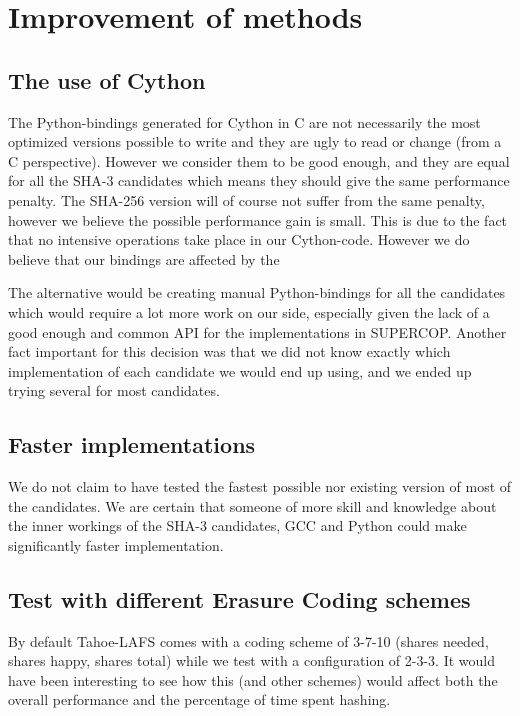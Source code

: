 \documentclass[english,12pt,a4paper]{book}
\begin{document}
%
%
%

\section{Improvement of methods}

\subsection{The use of Cython}


The Python-bindings generated for Cython in C are not necessarily the most
optimized versions possible to write and they are ugly to read or change (from
a C perspective). However we consider them to be good enough, and they are
equal for all the \ac{SHA}-3 candidates which means they should give the same
performance penalty. The \ac{SHA}-256 version will of course not suffer from
the same penalty, however we believe the possible performance gain is small.
This is due to the fact that no intensive operations take place in our
Cython-code. However we do believe that our bindings are affected by the 

The alternative would be creating manual Python-bindings for all the candidates
which would require a lot more work on our side, especially given the lack of a
good enough and common \ac{API} for the implementations in \ac{SUPERCOP}.
Another fact important for this decision was that we did not know exactly which
implementation of each candidate we would end up using, and we ended up trying
several for most candidates.

\subsection{Faster implementations}
We do not claim to have tested the fastest possible nor existing version
of most of the candidates. We are certain that someone of more skill and
knowledge about the inner workings of the \ac{SHA}-3 candidates, \ac{GCC} and
Python could make significantly faster implementation.

\subsection{Test with different Erasure Coding schemes}
By default Tahoe-\ac{LAFS} comes with a coding scheme of 3-7-10 (shares needed,
shares happy, shares total) while we test with a configuration of 2-3-3. It
would have been interesting to see how this (and other schemes) would affect
both the overall performance and the percentage of time spent hashing.
\end{document}

